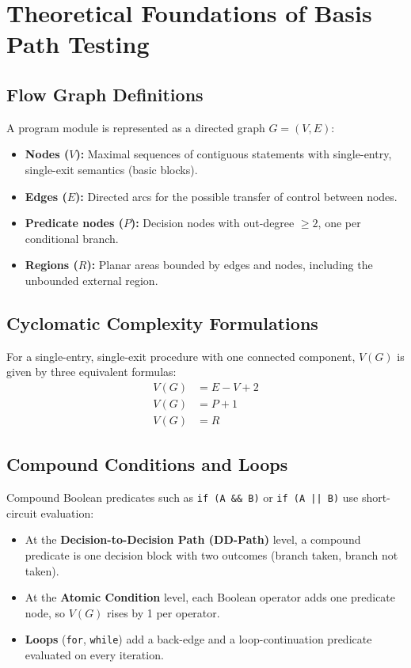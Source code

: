 \documentclass[12pt, a4paper]{report}
\begin{document}
\chapter{Theoretical Foundations of Basis Path Testing}

\section{Flow Graph Definitions}
A program module is represented as a directed graph $G = (V, E)$:
\begin{itemize}[leftmargin=1.5em]
  \item \textbf{Nodes ($V$):} Maximal sequences of contiguous statements with single-entry, single-exit semantics (basic blocks).
  \item \textbf{Edges ($E$):} Directed arcs for the possible transfer of control between nodes.
  \item \textbf{Predicate nodes ($P$):} Decision nodes with out-degree $\ge 2$, one per conditional branch.
  \item \textbf{Regions ($R$):} Planar areas bounded by edges and nodes, including the unbounded external region.
\end{itemize}

\section{Cyclomatic Complexity Formulations}
For a single-entry, single-exit procedure with one connected component, $V(G)$ is given by three equivalent formulas:
\begin{align}
V(G) &= E - V + 2 \\
V(G) &= P + 1 \\
V(G) &= R
\end{align}

\section{Compound Conditions and Loops}
Compound Boolean predicates such as \texttt{if (A \&\& B)} or \texttt{if (A || B)} use short-circuit evaluation:
\begin{itemize}[leftmargin=1.5em]
  \item At the \textbf{Decision-to-Decision Path (DD-Path)} level, a compound predicate is one decision block with two outcomes (branch taken, branch not taken).
  \item At the \textbf{Atomic Condition} level, each Boolean operator adds one predicate node, so $V(G)$ rises by 1 per operator.
  \item \textbf{Loops} (\texttt{for}, \texttt{while}) add a back-edge and a loop-continuation predicate evaluated on every iteration.
\end{itemize}
\end{document}
